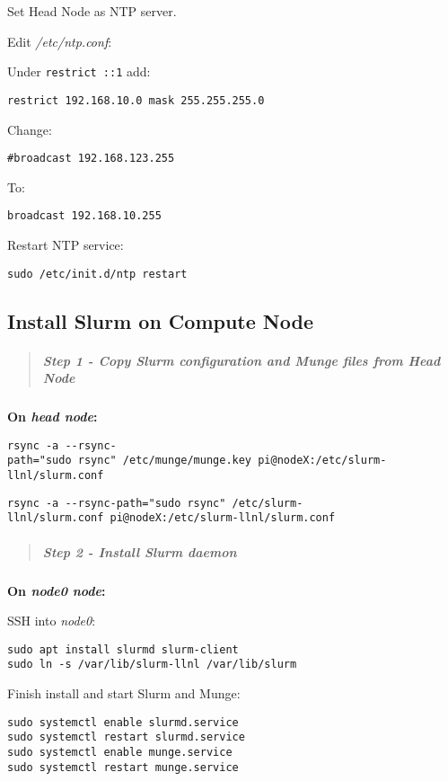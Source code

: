 \documentclass[]{article}
\let\oldsubparagraph\subparagraph
\renewcommand{\subparagraph}[1]{\oldsubparagraph{#1}\mbox{}}
\begin{document}
Set Head Node as NTP server.

Edit \emph{/etc/ntp.conf}:

Under \texttt{restrict\ ::1} add:

\texttt{restrict\ 192.168.10.0\ mask\ 255.255.255.0}

Change:

\texttt{\#broadcast\ 192.168.123.255}

To:

\texttt{broadcast\ 192.168.10.255}

Restart NTP service:

\texttt{sudo\ /etc/init.d/ntp\ restart}

\subsection{Install Slurm on Compute
Node}\label{install-slurm-on-compute-node}

\begin{quote}
\mbox{}%
\subparagraph{\texorpdfstring{Step 1 - Copy Slurm configuration and
Munge files from \emph{Head
Node}}{Step 1 - Copy Slurm configuration and Munge files from Head Node}}\label{step-1---copy-slurm-configuration-and-munge-files-from-head-node}
\end{quote}

\textbf{On \emph{head node}:}

\texttt{rsync\ -a\ -\/-rsync-path="sudo\ rsync"\ /etc/munge/munge.key\ pi@nodeX:/etc/slurm-llnl/slurm.conf}

\texttt{rsync\ -a\ -\/-rsync-path="sudo\ rsync"\ /etc/slurm-llnl/slurm.conf\ pi@nodeX:/etc/slurm-llnl/slurm.conf}

\begin{quote}
\mbox{}%
\subparagraph{Step 2 - Install Slurm
daemon}\label{step-2---install-slurm-daemon}
\end{quote}

\textbf{On \emph{node0 node}:}

SSH into \emph{node0}:

\begin{verbatim}
sudo apt install slurmd slurm-client
sudo ln -s /var/lib/slurm-llnl /var/lib/slurm
\end{verbatim}

Finish install and start Slurm and Munge:

\begin{verbatim}
sudo systemctl enable slurmd.service
sudo systemctl restart slurmd.service
sudo systemctl enable munge.service
sudo systemctl restart munge.service
\end{verbatim}
\end{document}
